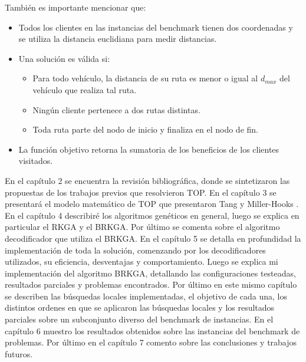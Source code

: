\begin{minipage}{\textwidth}
También es importante mencionar que:

\begin{itemize}
	\item Todos los clientes en las instancias del benchmark tienen dos coordenadas y se utiliza la distancia euclidiana para medir distancias.
	\item Una solución es válida si:
	\begin{itemize}
		\item Para todo vehículo, la distancia de su ruta es menor o igual al $d_{max}$ del vehículo que realiza tal ruta.
		\item Ningún cliente pertenece a dos rutas distintas.
		\item Toda ruta parte del nodo de inicio y finaliza en el nodo de fin.
	\end{itemize}
	\item La función objetivo retorna la sumatoria de los beneficios de los clientes visitados.
\end{itemize}
\end{minipage}

\bigskip

En el capítulo 2 se encuentra la revisión bibliográfica, donde se sintetizaron las propuestas de los trabajos previos que resolvieron TOP.
En el capítulo 3 se presentará el modelo matemático de TOP que presentaron Tang y Miller-Hooks \cite{TangMillerHooks} .
En el capítulo 4 describiré los algoritmos genéticos en general, luego se explica en particular el RKGA y el BRKGA. Por último se comenta sobre el algoritmo decodificador que utiliza el BRKGA.
En el capítulo 5 se detalla en profundidad la implementación de toda la solución, comenzando por los decodificadores utilizados, su eficiencia, desventajas y comportamiento. Luego se explica mi implementación del algoritmo BRKGA, detallando las configuraciones testeadas, resultados parciales y problemas encontrados. Por último en este mismo capítulo se describen las búsquedas locales implementadas, el objetivo de cada una, los distintos ordenes en que se aplicaron las búsquedas locales y los resultados parciales sobre un subconjunto diverso del benchmark de instancias.
En el capítulo 6 muestro los resultados obtenidos sobre las instancias del benchmark de problemas.
Por último en el capítulo 7 comento sobre las conclusiones y trabajos futuros.


























